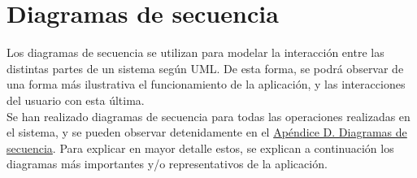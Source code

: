 \section{Diagramas de secuencia}

Los diagramas de secuencia se utilizan para modelar la interacción entre las distintas partes de un sistema según UML. De esta forma, se podrá observar de una forma más ilustrativa el funcionamiento de la aplicación, y las interacciones del usuario con esta última. 
\\

Se han realizado diagramas de secuencia para todas las operaciones realizadas en el sistema, y se pueden observar detenidamente en el \hyperref[enlaceDiagramasSecuencia]{Apéndice D. Diagramas de secuencia}. Para explicar en mayor detalle estos, se explican a continuación los diagramas más importantes y/o representativos de la aplicación.




